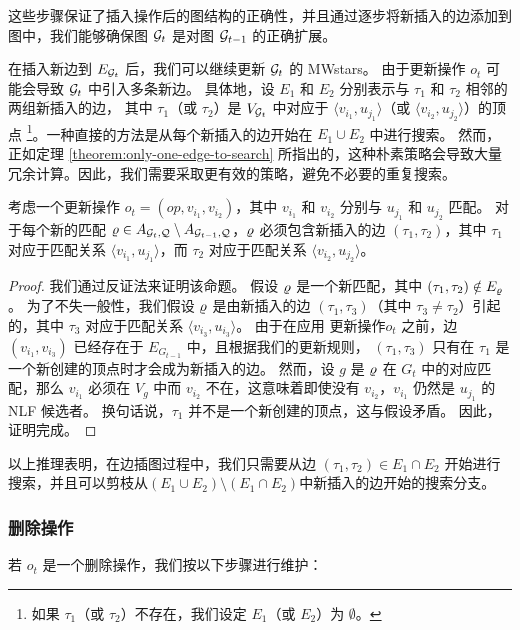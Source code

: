 这些步骤保证了插入操作后的图结构的正确性，并且通过逐步将新插入的边添加到图中，我们能够确保图 $\mathcal{G}_t$ 是对图 $\mathcal{G}_{t-1}$ 的正确扩展。

在插入新边到 $E_{\mathcal{G}_t}$ 后，我们可以继续更新 $\mathcal{G}_t$ 的 MWstars。
由于更新操作 $o_t$ 可能会导致 $\mathcal{G}_t$ 中引入多条新边。
具体地，设 $E_1$ 和 $E_2$ 分别表示与 $\tau_1$ 和 $\tau_2$ 相邻的两组新插入的边，
其中 $\tau_1$（或 $\tau_2$）是 $V_{\mathcal{G}_t}$ 中对应于 $\langle v_{i_1}, u_{j_1} \rangle$（或 $\langle v_{i_2}, u_{j_2} \rangle$）的顶点
\footnote{如果 $\tau_1$（或 $\tau_2$）不存在，我们设定 $E_1$（或 $E_2$）为 $\emptyset$。}。一种直接的方法是从每个新插入的边开始在 $E_1 \cup E_2$ 中进行搜索。
然而，正如定理 \ref{theorem:only-one-edge-to-search} 所指出的，这种朴素策略会导致大量冗余计算。因此，我们需要采取更有效的策略，避免不必要的重复搜索。

\begin{theorem} \label{theorem:only-one-edge-to-search}
    考虑一个更新操作 $o_t = (op, v_{i_1}, v_{i_2})$，其中 $v_{i_1}$ 和 $v_{i_2}$ 分别与 $u_{j_1}$ 和 $u_{j_2}$ 匹配。
    对于每个新的匹配 $\varrho \in A_{\mathcal{G}_t, \mathcal{Q}} \setminus A_{\mathcal{G}_{t-1}, \mathcal{Q}}$，$\varrho$ 必须包含新插入的边 $(\tau_1, \tau_2)$，其中 $\tau_1$ 对应于匹配关系 $\langle v_{i_1}, u_{j_1} \rangle$，而 $\tau_2$ 对应于匹配关系 $\langle v_{i_2}, u_{j_2} \rangle$。
\end{theorem}

\begin{proof}
    我们通过反证法来证明该命题。
    假设 $\varrho$ 是一个新匹配，其中 $(\tau_1, \tau_2) \notin E_{\varrho}$。
    为了不失一般性，我们假设 $\varrho$ 是由新插入的边 $(\tau_1, \tau_3)$（其中 $\tau_3 \neq \tau_2$）引起的，其中 $\tau_3$ 对应于匹配关系 $\langle v_{i_3}, u_{i_3} \rangle$。
    由于在应用 更新操作$o_t$ 之前，边 $(v_{i_1}, v_{i_3})$ 已经存在于 $E_{G_{t-1}}$ 中，且根据我们的更新规则，
    $(\tau_1, \tau_3)$ 只有在 $\tau_1$ 是一个新创建的顶点时才会成为新插入的边。
    然而，设 $g$ 是 $\varrho$ 在 $G_t$ 中的对应匹配，那么 $v_{i_1}$ 必须在 $V_g$ 中而 $v_{i_2}$ 不在，这意味着即使没有 $v_{i_2}$，$v_{i_1}$ 仍然是 $u_{j_1}$ 的 NLF 候选者。
    换句话说，$\tau_1$ 并不是一个新创建的顶点，这与假设矛盾。
    因此，证明完成。
\end{proof}

以上推理表明，在边插图过程中，我们只需要从边 $(\tau_1, \tau_2) \in E_1 \cap E_2$ 开始进行搜索，并且可以剪枝从$(E_1 \cup E_2) \setminus (E_1 \cap E_2)$中新插入的边开始的搜索分支。

\subsubsection{删除操作}
若 $o_t$ 是一个删除操作，我们按以下步骤进行维护：

